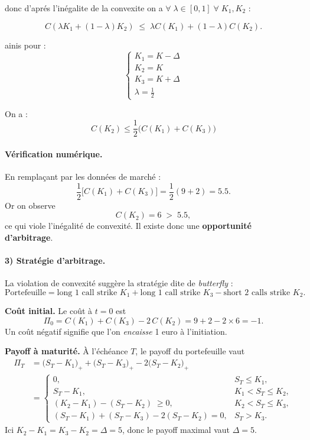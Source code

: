 donc d'aprés l'inégalite de la convexite on a $\forall \; \lambda \in [0,1] \; \forall \; K_1 , K_2$ : 

\[
C(\lambda K_1 + (1- \lambda) K_2 ) \;\le\; \lambda C(K_1) + ( 1 - \lambda) C(K_2).
\]

ainis pour :
\[
\begin{cases}
K_1 = K - \Delta\\
K_2 = K \\
K_3 = K + \Delta \\
\lambda = \frac{1}{2}
\end{cases}
\]

On a : 
\[
C(K_2) \le \frac{1}{2} \big(C(K_1) + C(K_3) \big)
\]


\paragraph{Vérification numérique.}
En remplaçant par les données de marché :
\[
\frac{1}{2}\big[C(K_1)+C(K_3)\big]
= \frac{1}{2}(9+2) = 5.5.
\]
Or on observe
\[
C(K_2) = 6 \;>\; 5.5,
\]
ce qui viole l'inégalité de convexité.
Il existe donc une \textbf{opportunité d'arbitrage}.

\paragraph{3) Stratégie d'arbitrage.}
La violation de convexité suggère la stratégie dite de \emph{butterfly} :
\[
\text{Portefeuille} =
\text{long } 1 \text{ call strike } K_1
+\text{long } 1 \text{ call strike } K_3
-\text{short } 2 \text{ calls strike } K_2.
\]
\smallskip

\textbf{Coût initial.}  
Le coût à $t=0$ est
\[
\Pi_0 = C(K_1)+C(K_3)-2\,C(K_2)
= 9 + 2 - 2\times 6 = -1.
\]
Un coût négatif signifie que l'on \emph{encaisse} 1 euro à l'initiation.

\textbf{Payoff à maturité.}  
À l'échéance $T$, le payoff du portefeuille vaut
\begin{align*}
\Pi_T
&= \big(S_T - K_1\big)_+ + \big(S_T - K_3\big)_+
      - 2\big(S_T - K_2\big)_+ \\
&=
\begin{cases}
0, & S_T \le K_1,\\[0.4em]
S_T - K_1, & K_1 < S_T \le K_2,\\[0.4em]
(K_2-K_1) - (S_T - K_2)  \; \ge 0, & K_2 < S_T \le K_3,\\[0.4em]
(S_T-K_1) + (S_T-K_3) - 2(S_T - K_2) = 0, & S_T > K_3.
\end{cases}
\end{align*}
Ici $K_2-K_1=K_3-K_2=\Delta=5$, donc le payoff maximal vaut $\Delta=5$.

